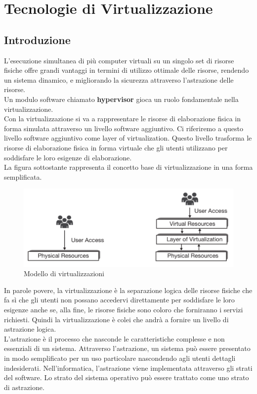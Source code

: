 \documentclass{article}
\begin{document}
\newpage
\section{Tecnologie di Virtualizzazione}
\subsection{Introduzione}
L'esecuzione simultanea di più computer virtuali su un singolo set di risorse fisiche offre grandi vantaggi in termini di utilizzo ottimale delle risorse, rendendo un sistema dinamico, e migliorando la sicurezza attraverso l'astrazione delle risorse. \\ 
Un modulo software chiamato \textbf{hypervisor} gioca un ruolo fondamentale nella virtualizzazione. \\
Con la virtualizzazione si va a rappresentare le risorse di elaborazione fisica in forma simulata attraverso un livello software aggiuntivo. Ci riferiremo a questo livello software aggiuntivo come layer of virtualization. Questo livello trasforma le risorse di elaborazione fisica in forma virtuale che gli utenti utilizzano per soddisfare le loro esigenze di elaborazione. \\
La figura sottostante rappresenta il concetto base di virtualizzazione in una forma semplificata. 
\begin{figure}[H]
    \centering
    \includegraphics[scale=0.5]{img/virtualization technologies.png}
    \caption{Modello di virtualizzazioni}
\end{figure}\noindent
In parole povere, la virtualizzazione è la separazione logica delle risorse fisiche che fa sì che gli utenti non possano accedervi direttamente per soddisfare le loro esigenze anche se, alla fine, le risorse fisiche sono coloro che forniranno i servizi richiesti. Quindi la virtualizzazione è colei che andrà a fornire un livello di astrazione logica. \\
L'astrazione è il processo che nasconde le caratteristiche complesse e non essenziali di un sistema. Attraverso l'astrazione, un sistema può essere presentato in modo semplificato per un uso particolare nascondendo agli utenti dettagli indesiderati. Nell'informatica, l'astrazione viene implementata attraverso gli strati del software. Lo strato del sistema operativo può essere trattato come uno strato di astrazione. \\
\end{document}
